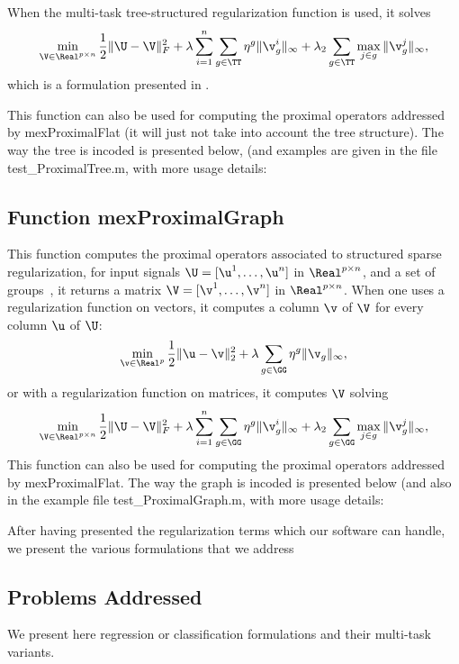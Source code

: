 \documentclass[a4paper, 11pt]{article}
\begin{document}
When the multi-task tree-structured regularization function is used, it solves
\begin{equation}
    \min_{\V \in \Real^{p\times n}} \frac{1}{2}\|\U-\V\|_F^2 + \lambda \sum_{i=1}^n\sum_{g \in \TT} \eta^g \|\v^i_g\|_\infty + \lambda_2\sum_{g \in \TT} \max_{j \in g} \|\v^j_g\|_\infty,
\end{equation} 
which is a formulation presented in \cite{mairal10}.

This function can also be used for computing the proximal operators addressed by mexProximalFlat (it will just not take into account the tree structure). The way the tree is incoded is presented below, (and examples are given in the file test\_ProximalTree.m, with more usage details:
{\footnotesize

}

\subsection{Function mexProximalGraph}
This function computes the proximal operators associated to structured sparse regularization, for input signals $\U=[\u^1,\ldots,\u^n]$ in $\Real^{p \times n}$, and a set of groups~\cite{mairal10}, it returns a matrix $\V=[\v^1,\ldots,\v^n]$ in $\Real^{p \times n}$.
When one uses a regularization function on vectors, it computes a column $\v$ of $\V$ for every column $\u$ of $\U$:
\begin{equation}
    \min_{\v \in \Real^p} \frac{1}{2}\|\u-\v\|_2^2 + \lambda \sum_{g \in \GG} \eta^g \|\v_g\|_\infty,
\end{equation}
or with a regularization function on matrices, it computes $\V$ solving
\begin{equation}
    \min_{\V \in \Real^{p\times n}} \frac{1}{2}\|\U-\V\|_F^2 + \lambda \sum_{i=1}^n\sum_{g \in \GG} \eta^g \|\v^i_g\|_\infty + \lambda_2\sum_{g \in \GG} \max_{j \in g} \|\v^j_g\|_\infty,
\end{equation} 
This function can also be used for computing the proximal operators addressed by mexProximalFlat. The way the graph is incoded is presented below (and also in the example file test\_ProximalGraph.m, with more usage details:

{\footnotesize

}

After having presented the regularization terms which our software can handle,
we present the various formulations that we address
\subsection{Problems Addressed}
We present here regression or classification formulations and their multi-task variants.
\end{document}
